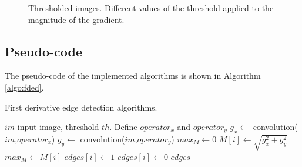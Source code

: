 \documentclass{ipol}
\numberwithin{equation}{section}
\numberwithin{table}{section}
\begin{document}
\begin{figure}[t!]
	\centering
	\quad
	\quad
	\caption{Thresholded images. Different values of the threshold applied to the magnitude of the gradient.}
	\label{fig:thresholding}
\end{figure}



\subsection{Pseudo-code}

The pseudo-code of the implemented algorithms is shown in Algorithm \ref{algo:fded}.

\clearpage

\begin{algorithm}[t]
\caption{First derivative edge detection algorithms.}
\label{algo:fded}
\begin{algorithmic}[1]
\Require $im$ input image, threshold $th$.
\State Define $operator_x$ and $operator_y$ 
\State $g_x \leftarrow$ convolution($im$,$operator_x$)
\State $g_y \leftarrow$ convolution($im$,$operator_y$)
\State $max_M \leftarrow 0$
	\State $M[i] \leftarrow \sqrt{g_x^2+g_y^2}$ 
		\State $max_M \leftarrow M[i]$
	\EndIf
\EndFor
{}
		\State $edges[i] \leftarrow 1$
	\Else
		\State $edges[i] \leftarrow 0$
	\EndIf
\EndFor
\Return $edges$
\end{algorithmic}
\end{algorithm}
\end{document}
